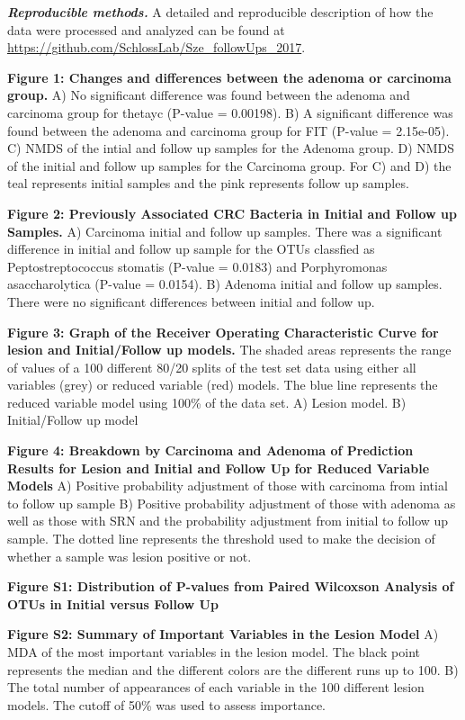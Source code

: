 \documentclass[12pt,]{article}
\begin{document}
\textbf{\emph{Reproducible methods.}} A detailed and reproducible
description of how the data were processed and analyzed can be found at
\url{https://github.com/SchlossLab/Sze_followUps_2017}.

\newpage

\textbf{Figure 1: Changes and differences between the adenoma or
carcinoma group.} A) No significant difference was found between the
adenoma and carcinoma group for thetayc (P-value = 0.00198). B) A
significant difference was found between the adenoma and carcinoma group
for FIT (P-value = 2.15e-05). C) NMDS of the intial and follow up
samples for the Adenoma group. D) NMDS of the initial and follow up
samples for the Carcinoma group. For C) and D) the teal represents
initial samples and the pink represents follow up samples.

\textbf{Figure 2: Previously Associated CRC Bacteria in Initial and
Follow up Samples.} A) Carcinoma initial and follow up samples. There
was a significant difference in initial and follow up sample for the
OTUs classfied as Peptostreptococcus stomatis (P-value = 0.0183) and
Porphyromonas asaccharolytica (P-value = 0.0154). B) Adenoma initial and
follow up samples. There were no significant differences between initial
and follow up.

\textbf{Figure 3: Graph of the Receiver Operating Characteristic Curve
for lesion and Initial/Follow up models.} The shaded areas represents
the range of values of a 100 different 80/20 splits of the test set data
using either all variables (grey) or reduced variable (red) models. The
blue line represents the reduced variable model using 100\% of the data
set. A) Lesion model. B) Initial/Follow up model

\textbf{Figure 4: Breakdown by Carcinoma and Adenoma of Prediction
Results for Lesion and Initial and Follow Up for Reduced Variable
Models} A) Positive probability adjustment of those with carcinoma from
intial to follow up sample B) Positive probability adjustment of those
with adenoma as well as those with SRN and the probability adjustment
from initial to follow up sample. The dotted line represents the
threshold used to make the decision of whether a sample was lesion
positive or not.

\newpage

\textbf{Figure S1: Distribution of P-values from Paired Wilcoxson
Analysis of OTUs in Initial versus Follow Up}

\textbf{Figure S2: Summary of Important Variables in the Lesion Model}
A) MDA of the most important variables in the lesion model. The black
point represents the median and the different colors are the different
runs up to 100. B) The total number of appearances of each variable in
the 100 different lesion models. The cutoff of 50\% was used to assess
importance.
\end{document}
